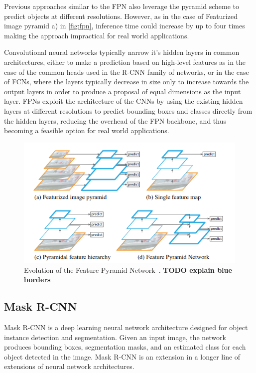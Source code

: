 \documentclass[english, bibtex]{kththesis}
\begin{document}
Previous approaches similar to the FPN also leverage the pyramid scheme to predict objects at different resolutions. However, as in the case of Featurized image pyramid a) in \autoref{fig:fpn}, inference time could increase by up to four times making the approach impractical for real world applications.

Convolutional neural networks typically narrow it’s hidden layers in common architectures, either to make a prediction based on high-level features as in the case of the common heads used in the R-CNN family of networks, or in the case of FCNs, where the layers typically decrease in size only to increase towards the output layers in order to produce a proposal of equal dimensions as the input layer. FPNs exploit the architecture of the CNNs by using the existing hidden layers at different resolutions to predict bounding boxes and classes directly from the hidden layers, reducing the overhead of the FPN backbone, and thus becoming a feasible option for real world applications.

\begin{figure}[H]
  \begin{center}
    \includegraphics[width=1.0\textwidth]{figures/fpn.png}
  \end{center}
  \caption{Evolution of the Feature Pyramid Network~\cite{DBLP:journals/corr/LinDGHHB16}. \textbf{TODO explain blue borders}}
  \label{fig:fpn}
\end{figure}

\subsection{Mask R-CNN}

Mask R-CNN is a deep learning neural network architecture designed for object instance detection and segmentation. Given an input image, the network produces bounding boxes, segmentation masks, and an estimated class for each object detected in the image. Mask R-CNN is an extension in a longer line of extensions of neural network architectures.
\end{document}
